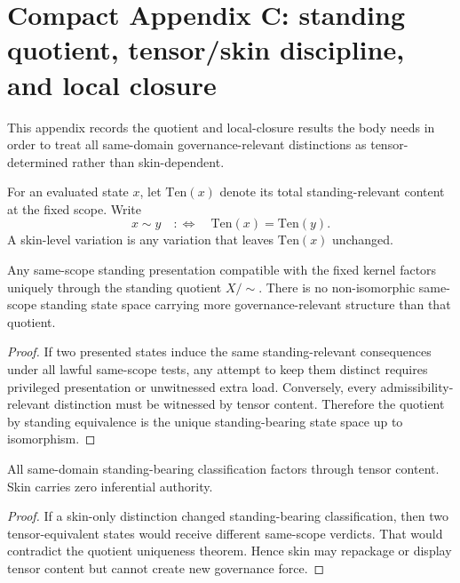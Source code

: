 \section{Compact Appendix C: standing quotient, tensor/skin discipline, and local closure}
\label{app:quotient}

This appendix records the quotient and local-closure results the body needs in order to treat all same-domain governance-relevant distinctions as tensor-determined rather than skin-dependent.

\begin{definition}
For an evaluated state $x$, let $\mathrm{Ten}(x)$ denote its total standing-relevant content at the fixed scope. Write
\[
x \sim y \quad :\Longleftrightarrow \quad \mathrm{Ten}(x)=\mathrm{Ten}(y).
\]
A skin-level variation is any variation that leaves $\mathrm{Ten}(x)$ unchanged.
\end{definition}

\begin{theorem}
Any same-scope standing presentation compatible with the fixed kernel factors uniquely through the standing quotient $X/{\sim}$. There is no non-isomorphic same-scope standing state space carrying more governance-relevant structure than that quotient.
\end{theorem}

\begin{proof}
If two presented states induce the same standing-relevant consequences under all lawful same-scope tests, any attempt to keep them distinct requires privileged presentation or unwitnessed extra load. Conversely, every admissibility-relevant distinction must be witnessed by tensor content. Therefore the quotient by standing equivalence is the unique standing-bearing state space up to isomorphism.
\end{proof}

\begin{corollary}
All same-domain standing-bearing classification factors through tensor content. Skin carries zero inferential authority.
\end{corollary}

\begin{proof}
If a skin-only distinction changed standing-bearing classification, then two tensor-equivalent states would receive different same-scope verdicts. That would contradict the quotient uniqueness theorem. Hence skin may repackage or display tensor content but cannot create new governance force.
\end{proof}

